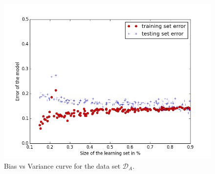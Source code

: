 \begin{figure}[!ht]
  \centering
  \caption{Bias vs Variance curve for the data set  $\mathcal{D}_{A}$. }
  \label{sandalone:bias_vs_variance_3}
    \includegraphics[scale=0.5]{../NLP-standalone-images/BiasVsVarianceD_A.png}
\end{figure}



